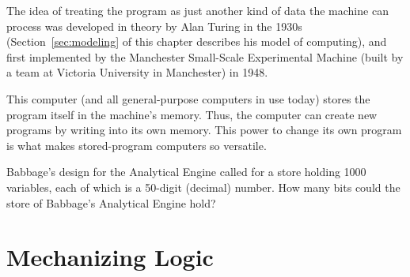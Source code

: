 \begin{schemeregion}
The idea of treating the program as just another kind of data the machine can process was developed in theory by Alan Turing in the 1930s (Section~\ref{sec:modeling} of this chapter describes his model of computing), and first implemented by the Manchester Small-Scale Experimental Machine (built by a team at Victoria University in Manchester) in 1948.  

This computer (and all general-purpose computers in use today) stores the program itself in the machine's memory.  Thus, the computer can create new programs by writing into its own memory.  This power to change its own program is what makes stored-program computers so versatile.



\beforeex
\begin{exercise}
Babbage's design for the Analytical Engine called for a store holding 1000 variables, each of which is a 50-digit (decimal) number.  How many bits could the store of Babbage's Analytical Engine hold? 
\solution{\LATER{}}
\end{exercise}
\afterex
 
\section{Mechanizing Logic}\label{sec:logic}


\end{schemeregion}
